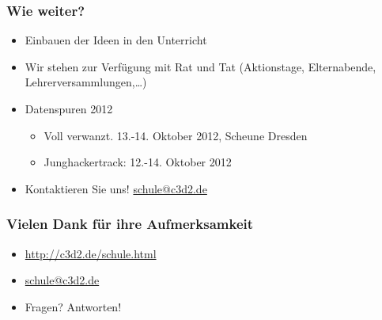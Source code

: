 \documentclass[14pt,handout]{beamer}
\begin{document}
\begin{frame}
  \frametitle{Wie weiter?}
  \begin{itemize}
    \item<2-> Einbauen der Ideen in den Unterricht
    \item<3-> Wir stehen zur Verfügung mit Rat und Tat (Aktionstage, Elternabende, Lehrerversammlungen,\ldots)
    \item<4-> Datenspuren 2012
      \begin{itemize}
        \item Voll verwanzt. 13.-14. Oktober 2012, Scheune Dresden
        \item Junghackertrack: 12.-14. Oktober 2012
      \end{itemize}
    \item<6-> Kontaktieren Sie uns! \url{schule@c3d2.de}
  \end{itemize}
\end{frame}

\begin{frame}
  \frametitle{Vielen Dank für ihre Aufmerksamkeit}
  \begin{itemize}
    \item \url{http://c3d2.de/schule.html}
    \item \url{schule@c3d2.de}
    \item Fragen? Antworten!
  \end{itemize}
\end{frame}
\end{document}
